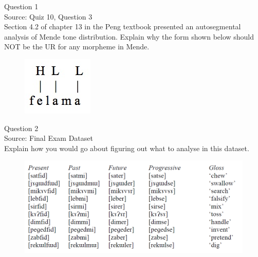 \documentclass[12pt]{article}
\begin{document}
\begin{center}
\textbf{{\color{blue}{\HUGE START OF EXAM\\}}}

\textbf{{\color{blue}{\HUGE Student ID: 2014\\}}}

\textbf{{\color{blue}{\HUGE 12:10 - 12:30 PM\\}}}

\end{center}
\newpage

{\large Question 1}\\

Source: Quiz 10, Question 3\\

Section 4.2 of chapter 13 in the Peng textbook presented an autosegmental analysis of Mende tone distribution. Explain why the form shown below should NOT be the UR for any morpheme in Mende.\\

\begin{figure}[H]
\includegraphics{../images/mende_junction_c.png}
\end{figure}

\newpage

{\large Question 2}\\

Source: Final Exam Dataset\\

Explain how you would go about figuring out what to analyse in this dataset.\\

\begin{figure}[H]
\includegraphics{../images/final_dataset.png}
\end{figure}
\end{document}
